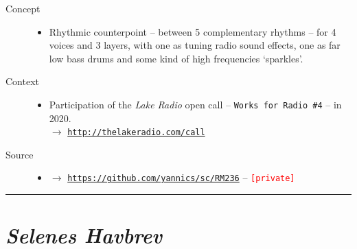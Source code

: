 \begin{description}
\item[Concept] \hfill 
\begin{itemize}
\item[] Rhythmic counterpoint -- between 5 complementary rhythms -- for 4 voices and 3 layers, with one as tuning radio sound effects, one as far low bass drums and some kind of high frequencies `sparkles'.
\end{itemize}
\bigskip
\item[Context] \hfill 
\begin{itemize}
\item[] Participation of the \textit{Lake Radio} open call -- \texttt{Works for Radio \#4} -- in 2020. \\
$\rightarrow$ \href{http://thelakeradio.com/call}{\texttt{\small http://thelakeradio.com/call}}
\end{itemize}
\bigskip
\bigskip
\item[Source] \hfill 
\begin{itemize}
\item[] $\rightarrow$ \href{https://github.com/yannics/sc/RM236}{\texttt{\small https://github.com/yannics/sc/RM236}}  -- \texttt{\textcolor{red}{\small[private]}}
\end{itemize}
\end{description}

\bigskip

\begin{center}\rule{0.5\linewidth}{0.5pt}\end{center}

\bigskip

\section*{\textsl{Selenes Havbrev}}


\bigskip

